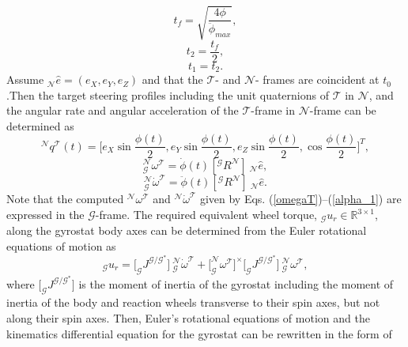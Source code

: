 \documentclass[journal ]{new-aiaa}
\begin{document}
\begin{equation}\label{tfcons_phit}
t_f = \sqrt{\frac{4\phi}{\ddot{\phi}_{max}}},
\end{equation}
\begin{equation}\label{t2cons_phit}
t_2 = \frac{t_f}{2},
\end{equation}
\begin{equation}\label{t1cons_phit}
t_1 = t_2 .
\end{equation}
		Assume $_\mathcal{N}\hat{e}=(e_X,e_Y, e_Z ) $ and that the $\mathcal{T}$- and $\mathcal{N}$- frames are coincident at $t_0$.Then the target steering profiles including the unit quaternions of $\mathcal{T}$ in $\mathcal{N}$, and the angular rate and angular acceleration of the $\mathcal{T}$-frame in $\mathcal{N}$-frame can be determined as
		\begin{equation}\label{quatT}
		^\mathcal{N}q^\mathcal{T}(t)=\Big[e_X\sin\frac{\phi(t)}{2}, e_Y\sin\frac{\phi(t)}{2}, e_Z\sin\frac{\phi(t)}{2}, \cos\frac{\phi(t)}{2}\Big]^T,
		\end{equation}
		\begin{equation}\label{omegaT}
		_\mathcal{G}^\mathcal{N}\omega^\mathcal{T}=\dot{\phi}(t)[^\mathcal{G}R^\mathcal{N}] \ _\mathcal{N}\hat{e},
		\end{equation}
		\begin{equation}\label{alpha_1}
		_\mathcal{G}^\mathcal{N}\dot{\omega}^\mathcal{T}=\ddot{\phi}(t)[^\mathcal{G}R^\mathcal{N}]\   _\mathcal{N}\hat{e}.
		\end{equation}		
Note that the computed $^\mathcal{N}\omega^\mathcal{T}$ and $^\mathcal{N}\dot{\omega}^\mathcal{T}$  given by Eqs. (\ref{omegaT})--(\ref{alpha_1}) are expressed in the $\mathcal{G}$-frame. The required equivalent wheel torque, $_\mathcal{G}u_r\in\mathbb{R}^{3\times 1}$, along the gyrostat body axes can be determined from the Euler rotational equations of motion as 
\begin{equation} \label{Euler_RBD}
_\mathcal{G}u_r=\big[_\mathcal{G}J^{\mathcal{G/G^*}}\big]\ _\mathcal{G}^\mathcal{N}\dot{\omega}^\mathcal{T} +\big[_\mathcal{G}^\mathcal{N}\omega^\mathcal{T}\big]^{ \times}\big[_\mathcal{G}J^{\mathcal{G/G^*}}\big]\ _\mathcal{G}^\mathcal{N}\omega^\mathcal{T},
\end{equation} 
where $\big[_\mathcal{G}J^{\mathcal{G/G^*}}\big]$ is the moment of inertia of the gyrostat including the moment of inertia of the body and reaction wheels transverse to their spin axes, but not along their spin axes. Then, Euler's rotational equations of motion and the kinematics differential equation for the gyrostat can be rewritten in the form of \cite{Markley2014} 
\end{document}
